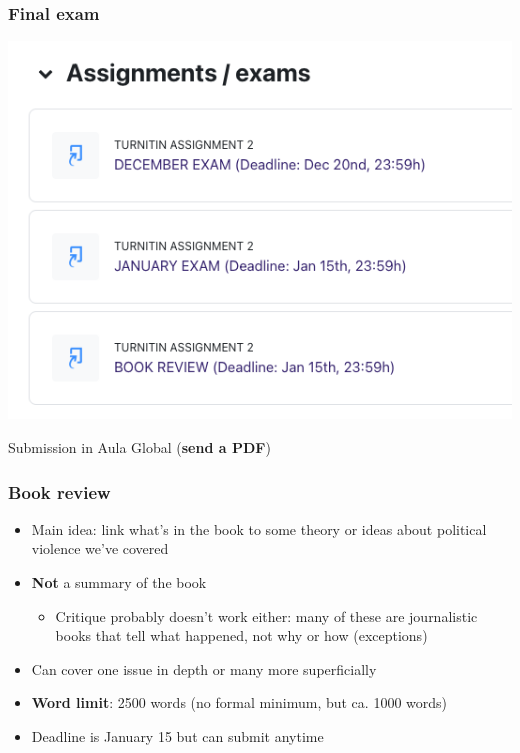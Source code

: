 \documentclass[aspectratio=43]{beamer}
\begin{document}
\begin{frame}
\frametitle{Final exam}
\centering

\includegraphics[width = \textwidth]{img/ag}

Submission in Aula Global (\textbf{send a PDF})

\end{frame}

\begin{frame}
\frametitle{\textbf{Book review}}
\centering

\begin{itemize}
  \item Main idea: link what's in the book to some theory or ideas about political violence we've covered
  \item \textbf{Not} a summary of the book
  \begin{itemize}
    \item Critique probably doesn't work either: many of these are journalistic books that tell what happened, not why or how (exceptions)
  \end{itemize}
  \item Can cover one issue in depth or many more superficially
  \item \textbf{Word limit}: 2500 words (no formal minimum, but ca. 1000 words)
  \item Deadline is January 15 but can submit anytime
\end{itemize}

\end{frame}
\end{document}
